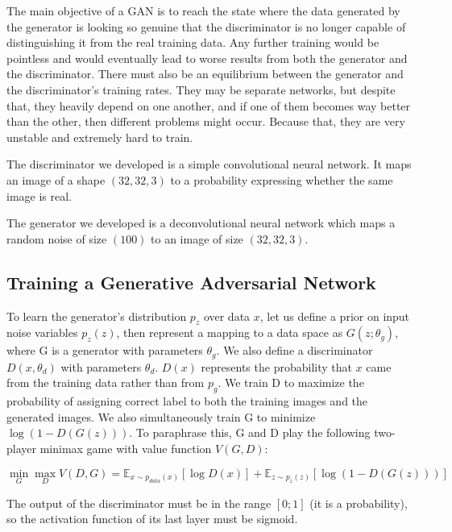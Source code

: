\documentclass{article}
\begin{document}
The main objective of a GAN is to reach the state where the data generated by the generator is looking so genuine that the discriminator is no longer capable of distinguishing it from the real training data. Any further training would be pointless and would eventually lead to worse results from both the generator and the discriminator. There must also be an equilibrium between the generator and the discriminator's training rates. They may be separate networks, but despite that, they heavily depend on one another, and if one of them becomes way better than the other, then different problems might occur. Because that, they are very unstable and extremely hard to train.

The discriminator we developed is a simple convolutional neural network. It maps an image of a shape $(32, 32, 3)$ to a probability expressing whether the same image is real.

The generator we developed is a deconvolutional \cite{5539957} neural network which maps a random noise of size $(100)$ to an image of size $(32, 32, 3)$.

\newpage

\subsection{Training a Generative Adversarial Network}
To learn the generator's distribution $p_{z}$ over data $x$, let us define a prior on input noise variables $p_{z}(z)$, then represent a mapping to a data space as $G(z;\theta_{g})$, where G is a generator with parameters $\theta_{g}$. We also define a discriminator $D(x, \theta_{d})$ with parameters $\theta_{d}$. $D(x)$ represents the probability that $x$ came from the training data rather than from $p_{g}$. We train D to maximize the probability of assigning correct label to both the training images and the generated images. We also simultaneously train G to minimize $\log(1 - D(G(z)))$. To paraphrase this, G and D play the following two-player minimax game with value function $V(G, D)$:

\begin{equation}\label{cross-entropy}
    \min_G \max_D V(D, G) = \mathbb{E}_{x\sim p_{data}(x)}[\log D(x)]
    + \mathbb{E}_{z\sim p_z(z)}[\log(1 - D(G(z)))]
\end{equation}

The output of the discriminator must be in the range $[0; 1]$ (it is a probability), so the activation function of its last layer must be sigmoid.
\end{document}
